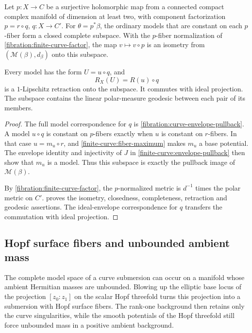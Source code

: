 \begin{corollary}\label{finite-curve:original-base-subspace}
Let $p\colon X\to C$ be a surjective holomorphic map from a connected
compact complex manifold of dimension at least two, with
component factorization $p=r\circ q$, $q\colon X\to C'$.
For $\theta=p^*\beta$, the ordinary models that are constant
on each $p$-fiber form a closed complete subspace. With the
$p$-fiber normalization of \cref{fibration:finite-curve-factor},
the map $v\mapsto v\circ p$ is an isometry from
$(\mathcal M(\beta),d_\beta)$ onto this subspace.

Every model has the form $U=u\circ q$, and
\[
 R_X(U)=R(u)\circ q
\]
is a $1$-Lipschitz retraction onto the subspace. It commutes
with ideal projection. The subspace contains the linear
polar-measure geodesic between each pair of its members.
\end{corollary}
\begin{proof}
The full model correspondence for $q$ is
\cref{fibration:curve-envelope-pullback}. A model $u\circ q$
is constant on $p$-fibers exactly when $u$ is constant on
$r$-fibers. In that case $u=m_u\circ r$, and
\cref{finite-curve:fiber-maximum} makes $m_u$ a base potential.
The envelope identity and injectivity of $J$ in
\cref{finite-curve:envelope-pullback} then show that
$m_u$ is a model. Thus this subspace is exactly the pullback
image of $\mathcal M(\beta)$.

By \cref{fibration:finite-curve-factor}, the $p$-normalized
metric is $d^{-1}$ times the polar metric on $C'$.
 proves the isometry, closedness,
completeness, retraction and geodesic assertions.
The ideal-envelope correspondence for $q$ transfers the
commutation with ideal projection.
\end{proof}

\subsection{Hopf surface fibers and unbounded ambient mass}
\label{subsec:hopf-surface-fibration}

The complete model space of a curve submersion can occur on a
manifold whose ambient Hermitian masses are unbounded. Blowing
up the elliptic base locus of the projection $[z_0:z_1]$ on the
scalar Hopf threefold turns this projection into a submersion
with Hopf surface fibers. The rank-one background then retains
only the curve singularities,
while the smooth potentials of the Hopf threefold still force
unbounded mass in a positive ambient background.

